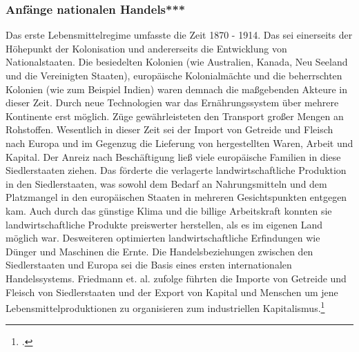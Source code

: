 \documentclass{scrartcl}
\begin{document}
\subsubsection*{Anfänge nationalen Handels***}
Das erste Lebensmittelregime umfasste die Zeit 1870 - 1914. Das sei einerseits der Höhepunkt der Kolonisation und andererseits die Entwicklung von Nationalstaaten. Die besiedelten Kolonien (wie Australien, Kanada, Neu Seeland und die Vereinigten Staaten), europäische Kolonialmächte und die beherrschten Kolonien (wie zum Beispiel Indien) waren demnach die maßgebenden Akteure in dieser Zeit. Durch neue Technologien war das Ernährungssystem über mehrere Kontinente erst möglich. Züge gewährleisteten den Transport großer Mengen an Rohstoffen. Wesentlich in dieser Zeit sei der Import von Getreide und Fleisch nach Europa und im Gegenzug die Lieferung von hergestellten Waren, Arbeit und Kapital. Der Anreiz nach Beschäftigung ließ viele europäische Familien in diese Siedlerstaaten ziehen. Das förderte die verlagerte landwirtschaftliche Produktion in den Siedlerstaaten, was sowohl dem Bedarf an Nahrungsmitteln und dem Platzmangel in den europäischen Staaten in mehreren Gesichtspunkten entgegen kam. Auch durch das günstige Klima und die billige Arbeitskraft konnten sie landwirtschaftliche Produkte preiswerter herstellen, als es im eigenen Land möglich war. Desweiteren optimierten landwirtschaftliche Erfindungen wie Dünger und Maschinen die Ernte. Die Handelsbeziehungen zwischen den Siedlerstaaten und Europa sei die Basis eines ersten internationalen Handelssystems. Friedmann et. al. zufolge führten die Importe von Getreide und Fleisch von Siedlerstaaten und der Export von Kapital und Menschen um jene Lebensmittelproduktionen zu organisieren zum industriellen Kapitalismus.\footcite[Vgl.][S.96ff]{Friedmann1989AGRICULTUREPresent}
\end{document}
